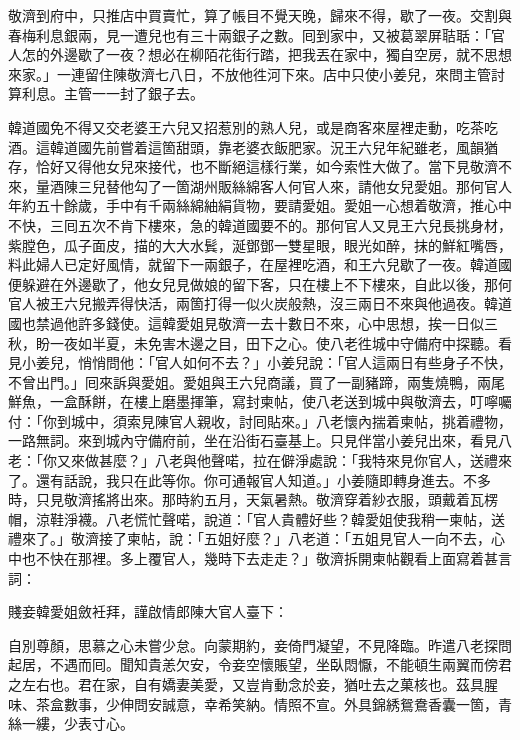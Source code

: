 敬濟到府中，只推店中買賣忙，算了帳目不覺天晚，歸來不得，歇了一夜。交割與春梅利息銀兩，見一遭兒也有三十兩銀子之數。囘到家中，又被葛翠屏聐聒：「官人怎的外邊歇了一夜？想必在柳陌花街行踏，把我丟在家中，獨自空房，就不思想來家。」一連留住陳敬濟七八日，不放他徃河下來。店中只使小姜兒，來問主管討算利息。主管一一封了銀子去。

韓道國免不得又交老婆王六兒又招惹別的熟人兒，{}或是商客來屋裡走動，吃茶吃酒。這韓道國先前嘗着這箇甜頭，靠老婆衣飯肥家。況王六兒年紀雖老，風韻猶存，恰好又得他女兒來接代，也不斷絕這樣行業，如今索性大做了。當下見敬濟不來，量酒陳三兒替他勾了一箇湖州販絲綿客人何官人來，請他女兒愛姐。那何官人年約五十餘歲，手中有千兩絲綿紬絹貨物，要請愛姐。愛姐一心想着敬濟，推心中不快，三囘五次不肯下樓來，急的韓道國要不的。那何官人又見王六兒長挑身材，紫膛色，瓜子面皮，描的大大水鬂，涎鄧鄧一雙星眼，眼光如醉，抹的鮮紅嘴唇，料此婦人已定好風情，{}就留下一兩銀子，在屋裡吃酒，和王六兒歇了一夜。韓道國便躲避在外邊歇了，他女兒見做娘的留下客，只在樓上不下樓來，自此以後，那何官人被王六兒搬弄得快活，兩箇打得一似火炭般熱，沒三兩日不來與他過夜。韓道國也禁過他許多錢使。{}這韓愛姐見敬濟一去十數日不來，心中思想，挨一日似三秋，盼一夜如半夏，未免害木邊之目，田下之心。使八老徃城中守備府中探聽。看見小姜兒，悄悄問他：「官人如何不去？」小姜兒說：「官人這兩日有些身子不快，不曾出門。」囘來訴與愛姐。愛姐與王六兒商議，買了一副豬蹄，兩隻燒鴨，兩尾鮮魚，一盒酥餅，在樓上磨墨揮筆，寫封柬帖，使八老送到城中與敬濟去，叮嚀囑付：「你到城中，須索見陳官人親收，討囘貼來。」八老懷內揣着柬帖，挑着禮物，一路無詞。來到城內守備府前，坐在沿街石臺基上。只見伴當小姜兒出來，看見八老：「你又來做甚麼？」八老與他聲喏，拉在僻淨處說：「我特來見你官人，送禮來了。還有話說，我只在此等你。你可通報官人知道。」小姜隨即轉身進去。不多時，只見敬濟搖將出來。那時約五月，天氣暑熱。敬濟穿着紗衣服，頭戴着瓦楞帽，涼鞋淨襪。八老慌忙聲喏，說道：「官人貴體好些？韓愛姐使我稍一柬帖，送禮來了。」敬濟接了柬帖，說：「五姐好麼？」八老道：「五姐見官人一向不去，心中也不快在那裡。多上覆官人，幾時下去走走？」敬濟拆開柬帖觀看上面寫着甚言詞：

\begin{myquote}[\markfont]
賤妾韓愛姐斂衽拜，謹啟情郎陳大官人臺下：

自別尊顏，思慕之心未嘗少怠。向蒙期約，妾倚門凝望，不見降臨。昨遣八老探問起居，不遇而囘。聞知貴恙欠安，令妾空懷賬望，坐臥悶懨，不能頓生兩翼而傍君之左右也。君在家，自有嬌妻美愛，又豈肯動念於妾，猶吐去之菓核也。茲具腥味、茶盒數事，少伸問安誠意，幸希笑納。情照不宣。{}外具錦綉鴛鴦香囊一箇，青絲一縷，少表寸心。

\end{myquote}

